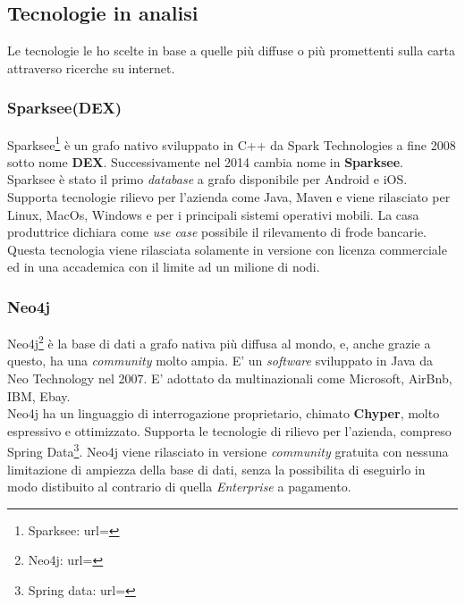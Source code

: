 \subsection{Tecnologie in analisi}
Le tecnologie le ho scelte in base a quelle più diffuse o più promettenti sulla carta attraverso ricerche su internet.

\subsubsection{Sparksee(DEX)}
Sparksee\footnote{Sparksee: url= } è un grafo nativo sviluppato in C++ da Spark Technologies a fine 2008 sotto nome \textbf{DEX}. Successivamente nel 2014 cambia nome in \textbf{Sparksee}.\\
Sparksee è stato il primo \textit{database} a grafo disponibile per Android e iOS.\\
Supporta tecnologie rilievo per l'azienda come Java, Maven e viene rilasciato per Linux, MacOs, Windows e per i principali sistemi operativi mobili.
La casa produttrice dichiara come \textit{use case} possibile il rilevamento di frode bancarie.\\
Questa tecnologia viene rilasciata solamente in versione con licenza commerciale ed in una accademica con il limite ad un milione di nodi.

\subsubsection{Neo4j}
Neo4j\footnote{Neo4j: url= } è la base di dati a grafo nativa più diffusa al mondo, e, anche grazie a questo, ha una \textit{community} molto ampia. E' un \textit{software} sviluppato in Java da Neo Technology nel 2007. E' adottato da multinazionali come Microsoft, AirBnb, IBM, Ebay.\\
Neo4j ha un linguaggio di interrogazione proprietario, chimato \textbf{Chyper}, molto espressivo e ottimizzato. Supporta le tecnologie di rilievo per l'azienda, compreso Spring Data\footnote{Spring data: url= }. Neo4j viene rilasciato in versione \textit{community} gratuita con nessuna limitazione di ampiezza della base di dati, senza la possibilita di eseguirlo in modo distibuito al contrario di quella \textit{Enterprise} a pagamento.


